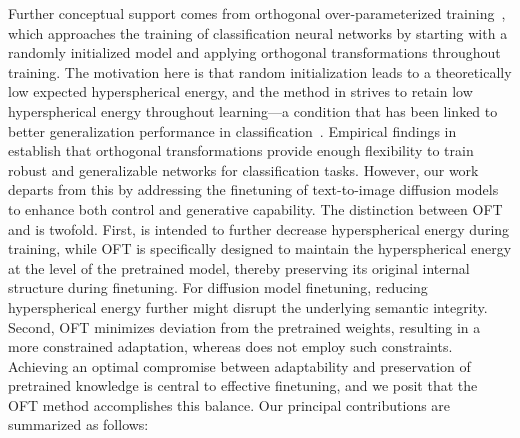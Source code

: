 Further conceptual support comes from orthogonal over-parameterized training~\cite{liu2021orthogonal}, which approaches the training of classification neural networks by starting with a randomly initialized model and applying orthogonal transformations throughout training. The motivation here is that random initialization leads to a theoretically low expected hyperspherical energy, and the method in \cite{liu2021orthogonal} strives to retain low hyperspherical energy throughout learning—a condition that has been linked to better generalization performance in classification~\cite{liu2018learning,lin2020regularizing}. Empirical findings in \cite{liu2021orthogonal} establish that orthogonal transformations provide enough flexibility to train robust and generalizable networks for classification tasks. However, our work departs from this by addressing the finetuning of text-to-image diffusion models to enhance both control and generative capability. The distinction between OFT and \cite{liu2021orthogonal} is twofold. First, \cite{liu2021orthogonal} is intended to further decrease hyperspherical energy during training, while OFT is specifically designed to maintain the hyperspherical energy at the level of the pretrained model, thereby preserving its original internal structure during finetuning. For diffusion model finetuning, reducing hyperspherical energy further might disrupt the underlying semantic integrity. Second, OFT minimizes deviation from the pretrained weights, resulting in a more constrained adaptation, whereas \cite{liu2021orthogonal} does not employ such constraints. Achieving an optimal compromise between adaptability and preservation of pretrained knowledge is central to effective finetuning, and we posit that the OFT method accomplishes this balance. Our principal contributions are summarized as follows:

